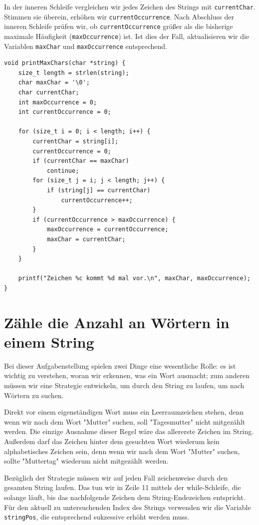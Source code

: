 In der inneren Schleife vergleichen wir jedes Zeichen des Strings mit
\texttt{currentChar}. Stimmen sie überein, erhöhen wir
\texttt{currentOccurrence}. Nach Abschluss der inneren Schleife prüfen
wir, ob \texttt{currentOccurrence} größer als die bisherige maximale
Häufigkeit (\texttt{maxOccurrence}) ist. Ist dies der Fall, aktualisieren
wir die Variablen \texttt{maxChar} und \texttt{maxOccurrence}
entsprechend.

\begin{verbatim}
void printMaxChars(char *string) {
    size_t length = strlen(string);
    char maxChar = '\0';
    char currentChar;
    int maxOccurrence = 0;
    int currentOccurrence = 0;

    for (size_t i = 0; i < length; i++) {
        currentChar = string[i];
        currentOccurrence = 0;
        if (currentChar == maxChar)
            continue;
        for (size_t j = i; j < length; j++) {
            if (string[j] == currentChar)
                currentOccurrence++;
        }
        if (currentOccurrence > maxOccurrence) {
            maxOccurrence = currentOccurrence;
            maxChar = currentChar;
        }
    }

    printf("Zeichen %c kommt %d mal vor.\n", maxChar, maxOccurrence);
}
\end{verbatim}





\chapter{Zähle die Anzahl an Wörtern in einem String}

Bei dieser Aufgabenstellung spielen zwei Dinge eine wesentliche Rolle: es ist
wichtig zu verstehen, woran wir erkennen, was ein Wort ausmacht; zum anderen
müssen wir eine Strategie entwickeln, um durch den String zu laufen, um nach
Wörtern zu suchen.

Direkt vor einem eigenständigen Wort muss ein Leerraumzeichen stehen, denn wenn
wir nach dem Wort "Mutter" suchen, soll "Tagesmutter" nicht mitgezählt werden.
Die einzige Ausnahme dieser Regel wäre das allererste Zeichen im String.
Außerdem darf das Zeichen hinter dem gesuchten Wort wiederum kein alphabetisches
Zeichen sein, denn wenn wir nach dem Wort "Mutter" suchen, sollte "Muttertag"
wiederum nicht mitgezählt werden.

Bezüglich der Strategie müssen wir auf jeden Fall zeichenweise durch den
gesamten String laufen. Das tun wir in Zeile 11 mittels der while-Schleife, die
solange läuft, bis das nachfolgende Zeichen dem String-Endezeichen entspricht.
Für den aktuell zu untersuchenden Index des Strings verwenden wir die Variable
\texttt{stringPos}, die entsprechend sukzessive erhöht werden muss.

